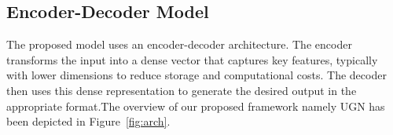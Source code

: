  

 


\subsection{Encoder-Decoder Model}
\label{EandD}
The proposed model uses an encoder-decoder architecture. The encoder transforms the input into a dense vector that captures key features, typically with lower dimensions to reduce storage and computational costs. The decoder then uses this dense representation to generate the desired output in the appropriate format.The overview of our proposed framework namely UGN has been depicted in Figure~\ref{fig:arch}.


